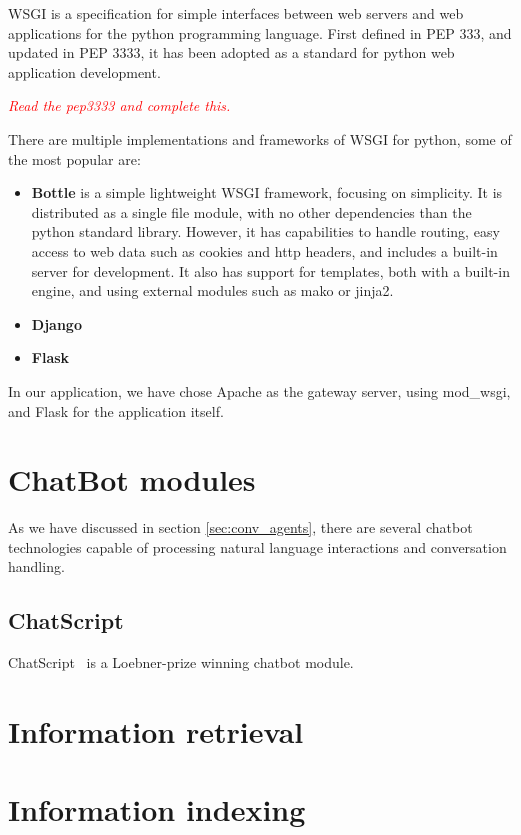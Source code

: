 \ac{WSGI} is a specification for simple interfaces between web servers and web applications for the python programming language. First defined in PEP 333\cite{pep0333}, and updated in PEP 3333\cite{pep3333}, it has been adopted as a standard for python web application development.

\emph{\textcolor{red}{Read the pep3333 and complete this.}}

There are multiple implementations and frameworks of WSGI for python, some of the most popular are:

\begin{itemize}
 \item \textbf{Bottle} is a simple lightweight WSGI framework, focusing on simplicity. It is distributed as a single file module, with no other dependencies than the python standard library. However, it has capabilities to handle routing, easy access to web data such as cookies and http headers, and includes a built-in server for development. It also has support for templates, both with a built-in engine, and using external modules such as mako or jinja2.
 \item \textbf{Django} 
 \item \textbf{Flask}
\end{itemize}

In our application, we have chose Apache as the gateway server, using mod\_wsgi, and Flask for the application itself.


\section{ChatBot modules}

As we have discussed in section \ref{sec:conv_agents}, there are several chatbot technologies capable of processing natural language interactions and conversation handling.

\subsection{ChatScript}
\label{subsec:chatscript}

ChatScript~\cite{wilcox2013} is a Loebner-prize winning chatbot module.

\section{Information retrieval}


\section{Information indexing}

